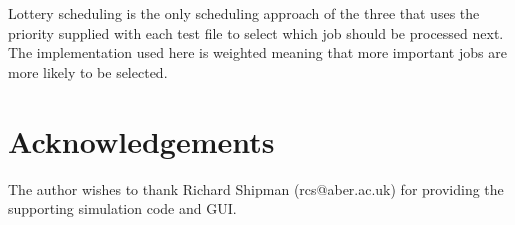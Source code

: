 \documentclass{acm_proc_article-sp}
\begin{document}
Lottery scheduling is the only scheduling approach of the three that uses the priority supplied with each test file to select which job should be processed next. The implementation used here is weighted meaning that more important jobs are more likely to be selected. 

\section{Acknowledgements}
The author wishes to thank Richard Shipman (rcs@aber.ac.uk) for providing the supporting simulation code and GUI.



\appendix

\balancecolumns
\end{document}
